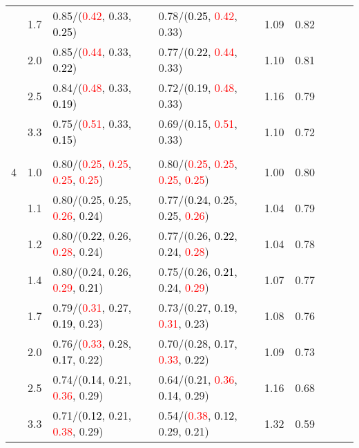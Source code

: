 \documentclass[10pt,a4paper]{report}
\begin{document}
\begin{table}[!htbp]
\begin{center}
{\begin{tabular}{ccllccccc}
			&1.7&0.85/(\textcolor{red}{0.42}, 0.33, \textcolor{black}{0.25})&0.78/(\textcolor{black}{0.25}, \textcolor{red}{0.42}, 0.33)&1.09&0.82\\
			&2.0&0.85/(\textcolor{red}{0.44}, 0.33, \textcolor{black}{0.22})&0.77/(\textcolor{black}{0.22}, \textcolor{red}{0.44}, 0.33)&1.10&0.81\\
			&2.5&0.84/(\textcolor{red}{0.48}, 0.33, \textcolor{black}{0.19})&0.72/(\textcolor{black}{0.19}, \textcolor{red}{0.48}, 0.33)&1.16&0.79\\
			&3.3&0.75/(\textcolor{red}{0.51}, 0.33, \textcolor{black}{0.15})&0.69/(\textcolor{black}{0.15}, \textcolor{red}{0.51}, 0.33)&1.10&0.72\\
			&&&&\\
			4			&1.0&0.80/(\textcolor{red}{0.25}, \textcolor{red}{0.25}, \textcolor{red}{0.25}, \textcolor{red}{0.25})&0.80/(\textcolor{red}{0.25}, \textcolor{red}{0.25}, \textcolor{red}{0.25}, \textcolor{red}{0.25})&1.00&0.80\\
			&1.1&0.80/(0.25, 0.25, \textcolor{red}{0.26}, \textcolor{black}{0.24})&0.77/(\textcolor{black}{0.24}, 0.25, 0.25, \textcolor{red}{0.26})&1.04&0.79\\
			&1.2&0.80/(\textcolor{black}{0.22}, 0.26, \textcolor{red}{0.28}, 0.24)&0.77/(0.26, \textcolor{black}{0.22}, 0.24, \textcolor{red}{0.28})&1.04&0.78\\
			&1.4&0.80/(0.24, 0.26, \textcolor{red}{0.29}, \textcolor{black}{0.21})&0.75/(0.26, \textcolor{black}{0.21}, 0.24, \textcolor{red}{0.29})&1.07&0.77\\
			&1.7&0.79/(\textcolor{red}{0.31}, 0.27, \textcolor{black}{0.19}, 0.23)&0.73/(0.27, \textcolor{black}{0.19}, \textcolor{red}{0.31}, 0.23)&1.08&0.76\\
			&2.0&0.76/(\textcolor{red}{0.33}, 0.28, \textcolor{black}{0.17}, 0.22)&0.70/(0.28, \textcolor{black}{0.17}, \textcolor{red}{0.33}, 0.22)&1.09&0.73\\
			&2.5&0.74/(\textcolor{black}{0.14}, 0.21, \textcolor{red}{0.36}, 0.29)&0.64/(0.21, \textcolor{red}{0.36}, \textcolor{black}{0.14}, 0.29)&1.16&0.68\\
			&3.3&0.71/(\textcolor{black}{0.12}, 0.21, \textcolor{red}{0.38}, 0.29)&0.54/(\textcolor{red}{0.38}, \textcolor{black}{0.12}, 0.29, 0.21)&1.32&0.59\\
			\bottomrule
		\end{tabular}}
	\end{center}
\end{table}
\end{document}
